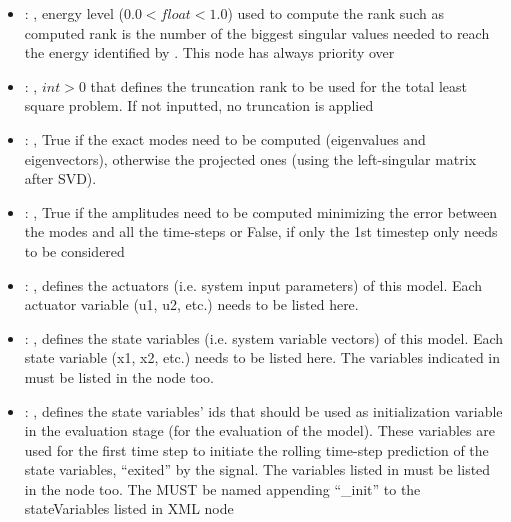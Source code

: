 \begin{itemize}
    \item {}: , 
      energy level ($0.0 < float < 1.0$) used to compute the rank such
      as computed rank is the number of the biggest singular values needed to reach the energy
      identified by                                                    . This
      node has always priority over  

    \item {}: , 
      $int > 0$ that defines the truncation rank to be used for the total
      least square problem. If not inputted, no truncation is applied

    \item {}: , 
      True if the exact modes need to be computed (eigenvalues and
      eigenvectors),   otherwise the projected ones (using the left-singular matrix after SVD).

    \item {}: , 
      True if the amplitudes need to be computed minimizing the error
      between the modes and all the time-steps or False, if only the 1st timestep only needs to be
      considered

    \item {}: , 
      defines the actuators (i.e. system input parameters)
      of this model. Each actuator variable (u1, u2, etc.) needs to
      be listed here.

    \item {}: , 
      defines the state variables (i.e. system variable vectors)
      of this model. Each state variable (x1, x2, etc.) needs to be listed
      here. The variables indicated in  must be
      listed in the  node too.

    \item {}: , 
      defines the state variables' ids  that should be used as
      initialization variable                                                   in the evaluation
      stage (for the evaluation of the model).
      These variables are used for the first time step to initiate
      the rolling time-step prediction of the state variables, ``exited''
      by the  signal. The variables listed in
       must be listed in the  
      node too.                                                   \nb The
       MUST be named appending ``\_init'' to
      the stateVariables listed in  XML node


\end{itemize}
